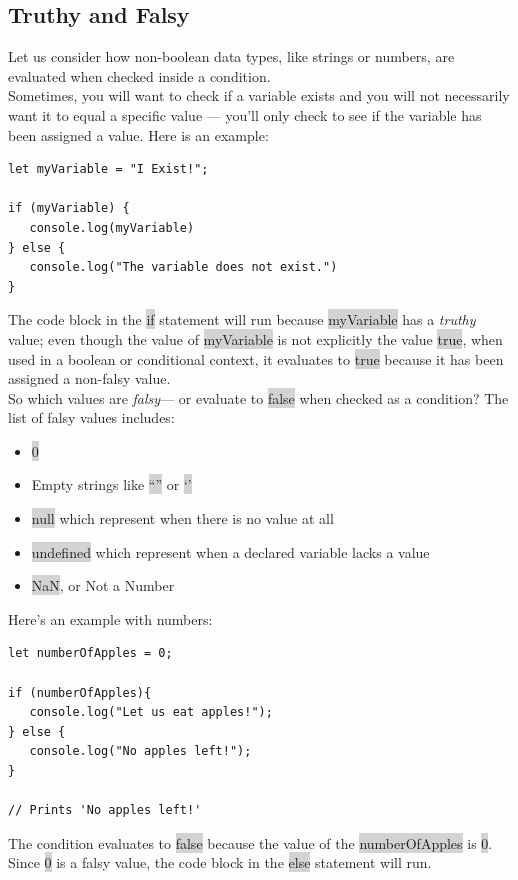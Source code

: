 \documentclass[11pt]{article}
\begin{document}
\subsection{Truthy and Falsy}
Let us consider how non-boolean data types, like strings or numbers, are evaluated when checked inside a condition. \\
\newline
Sometimes, you will want to check if a variable exists and you will not necessarily want it to equal a specific value — you’ll only check to see if the variable has been assigned a value. Here is an example:
\begin{lstlisting}
let myVariable = "I Exist!";

if (myVariable) {
   console.log(myVariable)
} else {
   console.log("The variable does not exist.")
}
\end{lstlisting}
The code block in the \colorbox{lightgray}{if} statement will run because \colorbox{lightgray}{myVariable} has a \textit{truthy} value; even though the value of \colorbox{lightgray}{myVariable} is not explicitly the value \colorbox{lightgray}{true}, when used in a boolean or conditional context, it evaluates to \colorbox{lightgray}{true} because it has been assigned a non-falsy value. \\
\newline
So which values are \textit{falsy}— or evaluate to \colorbox{lightgray}{false} when checked as a condition? The list of falsy values includes:
\begin{itemize}[leftmargin = *]
\item \colorbox{lightgray}{0}
\item Empty strings like \colorbox{lightgray}{``''} or \colorbox{lightgray}{`'}
\item \colorbox{lightgray}{null} which represent when there is no value at all
\item \colorbox{lightgray}{undefined} which represent when a declared variable lacks a value
\item \colorbox{lightgray}{NaN}, or Not a Number
\end{itemize}
Here’s an example with numbers: 
\begin{lstlisting}
let numberOfApples = 0;

if (numberOfApples){
   console.log("Let us eat apples!");
} else {
   console.log("No apples left!");
}

// Prints 'No apples left!'
\end{lstlisting}
The condition evaluates to \colorbox{lightgray}{false} because the value of the \colorbox{lightgray}{numberOfApples} is \colorbox{lightgray}{0}. Since \colorbox{lightgray}{0} is a falsy value, the code block in the \colorbox{lightgray}{else} statement will run.
\end{document}
